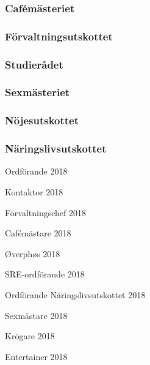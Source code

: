 \documentclass[../_main/handlingar.tex]{subfiles}
\begin{document}
\subsubsection*{Cafémästeriet}

\subsubsection*{Förvaltningsutskottet}

\subsubsection*{Studierådet}



\subsubsection*{Sexmästeriet}

\subsubsection*{Nöjesutskottet}

\subsubsection*{Näringslivsutskottet}

\newpage
\begin{signatures}{10}
    \mvh
    \signature{Daniel Bakic}{Ordförande 2018}
    \signature{Axel Voss}{Kontaktor 2018}
    \signature{Magnus Lundh}{Förvaltningschef 2018}
    \signature{Elin Johansson}{Cafémästare 2018}
    \signature{Andreas Bennström}{Øverphøs 2018}
    \signature{Fanny Månefjord}{SRE-ordförande 2018}
    \signature{Isabella Hansen}{Ordförande Näringslivsutskottet 2018}
    \signature{Alexander Wik}{Sexmästare 2018}
    \signature{Malin Heyden}{Krögare 2018}
    \signature{Adam Belfrage}{Entertainer 2018}
\end{signatures}
\end{document}
